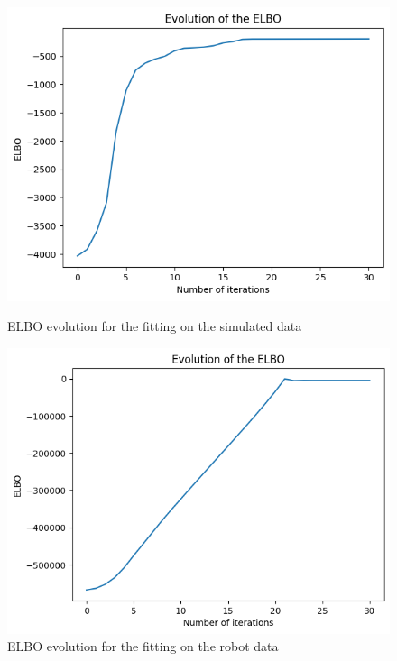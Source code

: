 \documentclass{article}
\begin{document}
\begin{figure}[H]
    \begin{minipage}{0.45\textwidth}
        \centering
        \includegraphics[scale=0.3]{images/elbo_sampled.png}
        \caption{ELBO evolution for the fitting on the simulated data}
        \label{fig:elbo_sim}
    \end{minipage}\hfill
    \begin{minipage}{0.45\textwidth}
        \centering
        \includegraphics[scale=0.3]{images/Robot_Elbo.png}
        \caption{ELBO evolution for the fitting on the robot data}
        \label{fig:elbo_rob}
    \end{minipage}
\end{figure}
\end{document}
